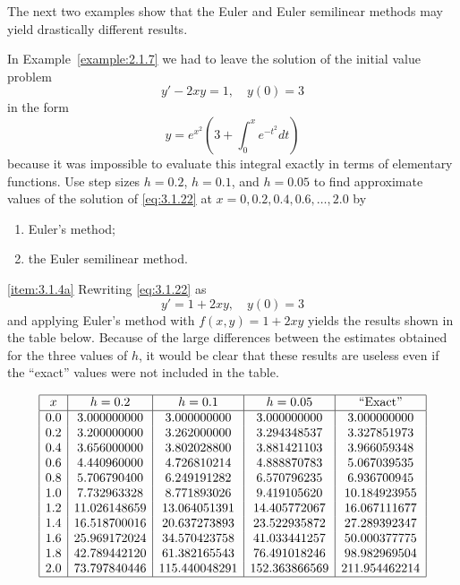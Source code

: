\documentclass{ximera}
\begin{document}
The next two examples show that the Euler and Euler semilinear
methods may yield drastically different results.

\begin{example}\label{example:3.1.4}
In Example~\ref{example:2.1.7} we had to leave the solution of the initial
value
problem
\begin{equation} \label{eq:3.1.22}
y'-2xy=1,\quad y(0)=3
\end{equation}
in the  form
\begin{equation} \label{eq:3.1.23}
y=e^{x^2}\left(3 +\int^x_0 e^{-t^2}dt\right)
\end{equation}
because it was impossible to evaluate this integral exactly in terms
of elementary functions.
Use step sizes $h=0.2$, $h=0.1$, and $h=0.05$ to find approximate
values
of the solution of \eqref{eq:3.1.22} at $x=0, 0.2, 0.4, 0.6,
\dots, 2.0$ by
\begin{enumerate}
\item\label{item:3.1.4a} Euler's method;   
\item\label{item:3.1.4b} the Euler semilinear method.
\end{enumerate}



\begin{explanation}
\ref{item:3.1.4a}
Rewriting \eqref{eq:3.1.22} as
\begin{equation} \label{eq:3.1.24}
y'=1+2xy,\quad y(0)=3
\end{equation}
and applying Euler's method with $f(x,y)=1+2xy$ yields the results
shown in the table below. Because of the large differences
between the estimates obtained for the three values of $h$, it
would be clear that these results are useless even if the ``exact''
values were not included in the table.

$$
\begin{array}{|c|c|c|c|c|}
\hline
x&
h=0.2&
h=0.1&
h=0.05&
\text{``Exact''}\\ \hline
0.0 &  3.000000000 & 3.000000000 & 3.000000000     &   3.000000000 \\
0.2 &  3.200000000 & 3.262000000 &3.294348537      &   3.327851973 \\
0.4 &  3.656000000 & 3.802028800 & 3.881421103     &   3.966059348 \\
0.6 &  4.440960000 & 4.726810214 & 4.888870783     &   5.067039535 \\
0.8 &  5.706790400 & 6.249191282 & 6.570796235     &   6.936700945 \\
1.0 &  7.732963328 & 8.771893026 & 9.419105620     &  10.184923955 \\
1.2 & 11.026148659 &13.064051391 &14.405772067     &  16.067111677 \\
1.4 & 16.518700016 &20.637273893 & 23.522935872    &  27.289392347 \\
1.6 & 25.969172024 &34.570423758 & 41.033441257    &  50.000377775 \\
1.8 & 42.789442120 &61.382165543 & 76.491018246    &  98.982969504 \\
2.0 & 73.797840446 & 115.440048291 & 152.363866569 & 211.954462214 \\
\hline
\end{array}
$$



\end{explanation}
\end{example}
\end{document}
